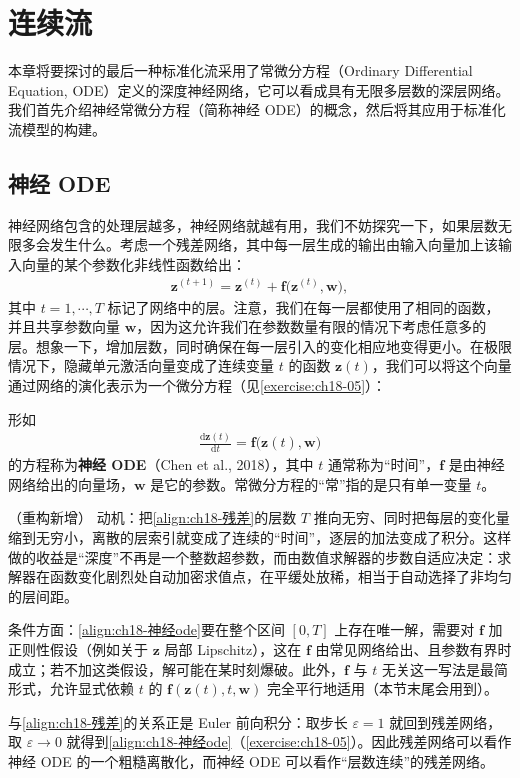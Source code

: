 \documentclass[../../main.tex]{subfiles}
\begin{document}
\section{连续流}\label{section:ch18-连续流}

本章将要探讨的最后一种标准化流采用了常微分方程（Ordinary Differential Equation, ODE）定义的深度神经网络，它可以看成具有无限多层数的深层网络。我们首先介绍神经常微分方程（简称神经 ODE）的概念，然后将其应用于标准化流模型的构建。

\subsection{神经 ODE}\label{subsection:ch18-神经ode}

神经网络包含的处理层越多，神经网络就越有用，我们不妨探究一下，如果层数无限多会发生什么。考虑一个残差网络，其中每一层生成的输出由输入向量加上该输入向量的某个参数化非线性函数给出：
\begin{align}
  \bm{z}^{(t+1)}=\bm{z}^{(t)}+\bm{f}\big(\bm{z}^{(t)},\bm{w}\big),\label{align:ch18-残差}
\end{align}
其中 $t=1,\cdots,T$ 标记了网络中的层。注意，我们在每一层都使用了相同的函数，并且共享参数向量 $\bm{w}$，因为这允许我们在参数数量有限的情况下考虑任意多的层。想象一下，增加层数，同时确保在每一层引入的变化相应地变得更小。在极限情况下，隐藏单元激活向量变成了连续变量 $t$ 的函数 $\bm{z}(t)$，我们可以将这个向量通过网络的演化表示为一个微分方程（见\cref{exercise:ch18-05}）：

\begin{definition}[神经 ODE]\label{definition:ch18-神经ode}
形如
\begin{align}
  \frac{\mathrm{d}\bm{z}(t)}{\mathrm{d}t}=\bm{f}\big(\bm{z}(t),\bm{w}\big)\label{align:ch18-神经ode}
\end{align}
的方程称为\textbf{神经 ODE}（Chen et al., 2018），其中 $t$ 通常称为“时间”，$\bm{f}$ 是由神经网络给出的向量场，$\bm{w}$ 是它的参数。常微分方程的“常”指的是只有单一变量 $t$。
\end{definition}

\begin{remark}（重构新增）
动机：把\eqref{align:ch18-残差}的层数 $T$ 推向无穷、同时把每层的变化量缩到无穷小，离散的层索引就变成了连续的“时间”，逐层的加法变成了积分。这样做的收益是“深度”不再是一个整数超参数，而由数值求解器的步数自适应决定：求解器在函数变化剧烈处自动加密求值点，在平缓处放稀，相当于自动选择了非均匀的层间距。

条件方面：\eqref{align:ch18-神经ode}要在整个区间 $[0,T]$ 上存在唯一解，需要对 $\bm{f}$ 加正则性假设（例如关于 $\bm{z}$ 局部 Lipschitz），这在 $\bm{f}$ 由常见网络给出、且参数有界时成立；若不加这类假设，解可能在某时刻爆破。此外，$\bm{f}$ 与 $t$ 无关这一写法是最简形式，允许显式依赖 $t$ 的 $\bm{f}(\bm{z}(t),t,\bm{w})$ 完全平行地适用（本节末尾会用到）。

与\eqref{align:ch18-残差}的关系正是 Euler 前向积分：取步长 $\varepsilon=1$ 就回到残差网络，取 $\varepsilon\to0$ 就得到\eqref{align:ch18-神经ode}（\cref{exercise:ch18-05}）。因此残差网络可以看作神经 ODE 的一个粗糙离散化，而神经 ODE 可以看作“层数连续”的残差网络。
\end{remark}
\end{document}
